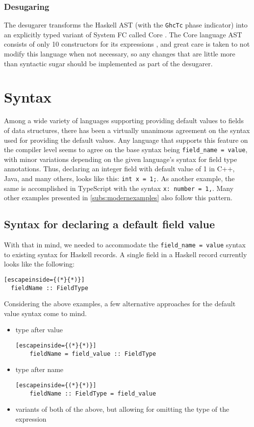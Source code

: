 \documentclass[en]{pracamgr}
\newcommand{\code}[1]{\lstinline[breaklines=true]{#1}}
\begin{document}
\subsection{Desugaring}
The desugarer transforms the Haskell AST (with the \code{GhcTc} phase indicator) into an explicitly typed variant of System FC called Core \cite{CoreWiki}.
The Core language AST consists of only 10 constructors for its expressions \cite{GHCCoreDef},
and great care is taken to not modify this language when not necessary, 
so any changes that are little more than syntactic sugar should be implemented as part of the desugarer.

\chapter{Syntax}\label{ch:syn}
Among a wide variety of languages supporting providing default values to fields of data structures, there has been a virtually unanimous agreement on the syntax used for providing the default values.
Any language that supports this feature on the compiler level seems to agree on the base syntax being \code{field_name = value}, 
with minor variations depending on the given language's syntax for field type annotations.
Thus, declaring an integer field with default value of 1 in C++, Java, and many others, looks like this: \code{int x = 1;}.
As another example, the same is accomplished in TypeScript with the syntax \code{x: number = 1,}. 
Many other examples presented in \ref{subs:modernexamples} also follow this pattern.

\section{Syntax for declaring a default field value}
With that in mind, we needed to accommodate the \code{field_name = value} syntax to existing syntax for Haskell records.
A single field in a Haskell record currently looks like the following:
\begin{lstlisting}[escapeinside={(*}{*)}]
  fieldName :: FieldType
\end{lstlisting}
Considering the above examples, a few alternative approaches for the default value syntax come to mind.

\begin{itemize}
  \item type after value
  \begin{lstlisting}[escapeinside={(*}{*)}]
    fieldName = field_value :: FieldType
  \end{lstlisting}
  \item type after name
  \begin{lstlisting}[escapeinside={(*}{*)}]
    fieldName :: FieldType = field_value
  \end{lstlisting}
  \item variants of both of the above, but allowing for omitting the type of the expression
\end{itemize}
\end{document}
